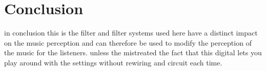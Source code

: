 \clearpage
\section{Conclusion}
in conclusion this is the filter and filter systems used here have a distinct impact on the music perception and can therefore be used to modify the perception of the music for the listeners.
unless the mistreated the fact that this digital lets you play around with the settings without rewiring and circuit each time.

